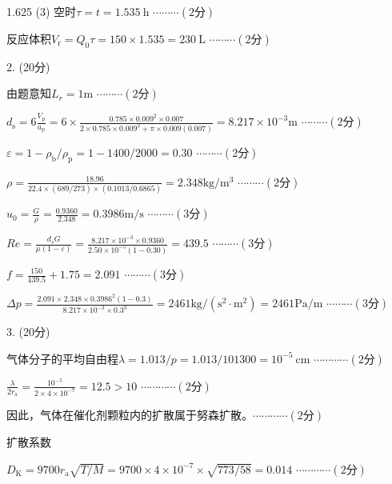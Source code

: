 \documentclass[12pt, b5paper]{article}
\begin{document}
\begin{spacing}{1.625}
(3) 空时$\tau = t = 1.535\ \mathrm{h}$ \hfill $\cdots \cdots \cdots (2\text{分})$

反应体积$V_\mathrm{r} = Q_0\tau = 150\times 1.535 = 230 \ \mathrm{L}$ \hfill $\cdots \cdots \cdots (2\text{分})$

\bigskip
\bigskip

2. (20分) 

由题意知$L_r = 1 \mathrm{m}$ \hfill $\cdots \cdots \cdots (2\text{分})$

$d_\mathrm{s}=6\frac{V_\mathrm{p}}{a_\mathrm{p}}=6\times\frac{0.785\times0.009^2\times0.007}{2\times0.785\times0.009^2+\pi\times0.009(0.007)}=8.217\times10^{-3}\mathrm{m}$ \hfill $\cdots \cdots \cdots (2\text{分})$

$\varepsilon=1-\rho_{\mathrm{b}}/\rho_{\mathrm{p}}=1-1400/2000=0.30$ \hfill $\cdots \cdots \cdots (2\text{分})$

$\rho=\frac{18.96}{22.4\times(689/273)\times(0.1013/0.6865)}=2.348\mathrm{kg/m^{3}}$ \hfill $\cdots \cdots \cdots (2\text{分})$

$u_{0}=\frac{G}{\rho}=\frac{0.9360}{2.348}=0.3986\mathrm{m/s}$ \hfill $\cdots \cdots \cdots (3\text{分})$

$Re=\frac{d_sG}{\mu\left(1-\varepsilon\right)}=\frac{8.217\times10^{-3}\times0.9360}{2.50\times10^{-5}\left(1-0.30\right)}=439.5$ \hfill $\cdots \cdots \cdots (3\text{分})$

$f=\frac{150}{439.5}+1.75=2.091$ \hfill $\cdots \cdots \cdots (3\text{分})$

$\Delta p=\frac{2.091\times2.348\times0.3986^2(1-0.3)}{8.217\times10^{-3}\times0.3^3}=2461\mathrm{kg/(s^2\cdot m^2)=2461Pa/m}$ \hfill $\cdots \cdots \cdots (3\text{分})$

\bigskip
\bigskip

3. (20分) 

气体分子的平均自由程$\lambda = 1.013/p = 1.013/101300 = 10^{-5} \ \mathrm{cm}$ \hfill  $\cdots \cdots \cdots \cdots (2\text{分})$ 

$\frac{\lambda}{2r_\mathrm{a}} = \frac{10^{-5}}{2\times 4\times 10^{-7}} = 12.5 > 10$ \hfill  $\cdots \cdots \cdots \cdots (2\text{分})$ 

因此，气体在催化剂颗粒内的扩散属于努森扩散。\hfill  $\cdots \cdots \cdots \cdots (2\text{分})$ 

扩散系数

$D_\mathrm{K} = 9700r_\mathrm{a}\sqrt{T/M} = 9700\times 4\times 10^{-7} \times \sqrt{773/58} = 0.014$ \hfill  $\cdots \cdots \cdots \cdots (2\text{分})$ 


\end{spacing}
\end{document}
